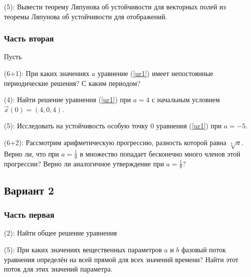 \documentclass[a4paper]{article}
\newcommand{\skill}[1]{\textsf{(#1):}}
\begin{document}
\begin{problem}
\skill{5} Вывести теорему Ляпунова об устойчивости для векторных полей из теоремы Ляпунова об устойчивости
для отображений.
\end{problem}

\subsubsection{Часть вторая}

\begin{problem}\label{p6}
Пусть

 \skill{6+1} При каких значениях $a$ уравнение (\ref{ur1})  имеет непостоянные периодические
решения? С каким периодом?

 \skill{4} Найти решение уравнения (\ref{ur1}) при $a=4$ с начальным условием $\vec{x}(0)=(4,0,4)$.
\end{problem}

\begin{problem}
\skill{5} Исследовать на устойчивость особую точку $0$ уравнения (\ref{ur1}) при $a=-5$.
\end{problem}

\begin{problem}
\skill{6+2} Рассмотрим арифметическую прогрессию, разность которой  равна $\sqrt[3]a$. Верно ли, что при
$a=\frac19$ в множество
попадает бесконечно много членов этой
прогрессии? Верно ли аналогичное утверждение при $a=\frac18$?
\end{problem}

\subsection{Вариант 2}

\subsubsection{Часть первая}
\begin{problem}
\skill{2}
Найти общее решение уравнения
\end{problem}

\begin{problem}
\skill{5} При каких значениях вещественных параметров $a$ и $b$ фазовый поток
уравнения  определён на всей прямой для всех значений времени?
Найти этот поток для этих значений параметра.
\end{problem}
\end{document}
